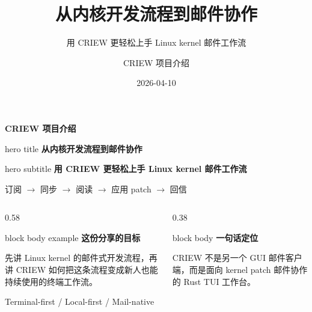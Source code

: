 \documentclass[aspectratio=169,professionalfonts]{beamer}
\title{从内核开发流程到邮件协作}
\subtitle{用 CRIEW 更轻松上手 Linux kernel 邮件工作流}
\author{CRIEW 项目介绍}
\date{2026-04-10}
\begin{document}
\begin{frame}[plain]
  \vspace{0.3cm}
  {\color{criewGold}\Large\bfseries CRIEW 项目介绍}\par
  \vspace{0.45cm}
  \begin{beamercolorbox}[wd=0.9\linewidth,sep=0.6em,rounded=true,center]{hero title}
    \fontsize{24}{28}\selectfont\bfseries 从内核开发流程到邮件协作
  \end{beamercolorbox}
  \vspace{0.3cm}
  \begin{beamercolorbox}[wd=0.86\linewidth,sep=0.45em,rounded=true,center]{hero subtitle}
    \large\bfseries 用 CRIEW 更轻松上手 Linux kernel 邮件工作流
  \end{beamercolorbox}
  \vspace{0.55cm}
  {\color{criewCharcoal}\normalsize 订阅 $\rightarrow$ 同步 $\rightarrow$ 阅读 $\rightarrow$ 应用 patch $\rightarrow$ 回信}\par
  \vspace{0.8cm}
  \begin{columns}[T,totalwidth=\textwidth]
    \begin{column}{0.58\textwidth}
      \begin{beamercolorbox}[wd=\linewidth,sep=1em,rounded=true]{block body example}
        \color{criewInk}
        \textbf{这份分享的目标}\par
        \vspace{0.35em}
        先讲 Linux kernel 的邮件式开发流程，再讲 CRIEW 如何把这条流程变成新人也能持续使用的终端工作流。
      \end{beamercolorbox}
      \vspace{0.45cm}
      {\color{criewCharcoal}\small Terminal-first / Local-first / Mail-native}
    \end{column}
    \begin{column}{0.38\textwidth}
      \begin{beamercolorbox}[wd=\linewidth,sep=1em,rounded=true]{block body}
        \color{criewInk}
        \textbf{一句话定位}\par
        \vspace{0.35em}
        CRIEW 不是另一个 GUI 邮件客户端，而是面向 kernel patch 邮件协作的 Rust TUI 工作台。
      \end{beamercolorbox}
    \end{column}
  \end{columns}
\end{frame}
\end{document}

